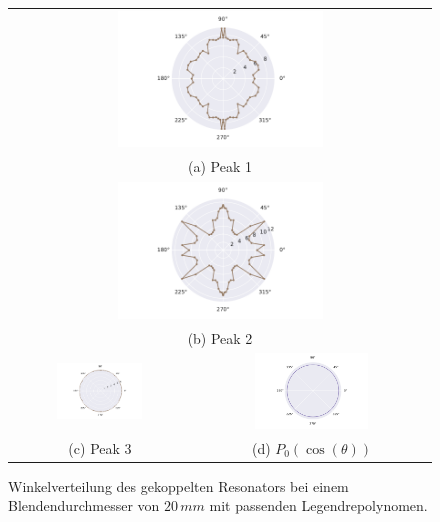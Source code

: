 \begin{figure}[H]
  \centering
  \begin{tabular}{cc}
  \multicolumn{2}{c}{\includegraphics[width=0.5\textwidth]{Daten/Wasserstoffmolekuelion/peak0.pdf}}\\[6pt]
  \multicolumn{2}{c}{(a) Peak 1}\\[6pt]
  \multicolumn{2}{c}{\includegraphics[width=0.5\textwidth]{Daten/Wasserstoffmolekuelion/peak1.pdf}}\\[6pt]
  \multicolumn{2}{c}{(b) Peak 2}\\[6pt]
  \includegraphics[width=0.5\textwidth]{Daten/Wasserstoffmolekuelion/peak2.pdf} &   \includegraphics[width=0.5\textwidth]{Daten/Wasserstoffmolekuelion/peakLeg.pdf}\\[6pt]
  (c)  Peak 3 & (d)  $P_0(\cos(\theta))$ \\[6pt]
  \end{tabular}
  \caption{Winkelverteilung des gekoppelten Resonators bei einem Blendendurchmesser von $20\, mm$ mit passenden Legendrepolynomen.} 
  \label{fig:h2_2}
\end{figure}
